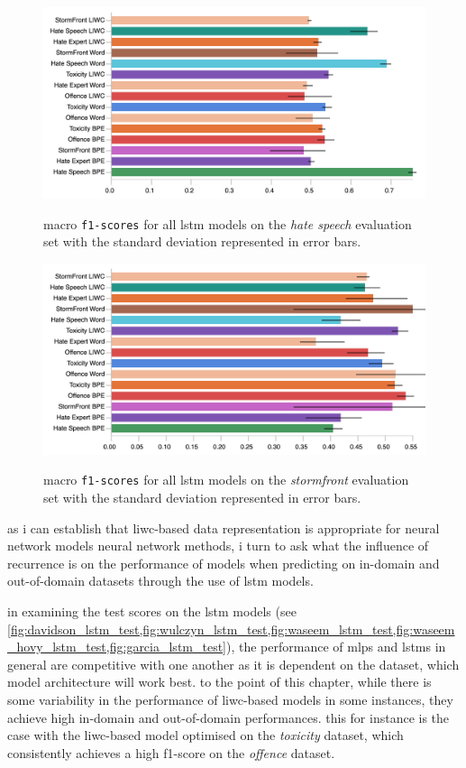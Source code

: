 \begin{figure}
\begin{minipage}{\textwidth}
    \centering
    \includegraphics[width=\textwidth]{all_lstm_waseem_hovy_test.pdf}
    \caption{macro \texttt{f1-scores} for all lstm models on the \textit{hate speech} evaluation set with the standard deviation represented in error bars.}
  \label{fig:waseem_hovy_lstm_test}  
  \vfill
    \includegraphics[width=\textwidth]{all_lstm_garcia_test.pdf}
  \caption{macro \texttt{f1-scores} for all lstm models on the \textit{stormfront} evaluation set with the standard deviation represented in error bars.}
  \label{fig:garcia_lstm_test}
\end{minipage}
\end{figure}

as i can establish that liwc-based data representation is appropriate for neural network models neural network methods, i turn to ask what the influence of recurrence is on the performance of models when predicting on in-domain and out-of-domain datasets through the use of lstm models.

in examining the test scores on the lstm models (see \cref{fig:davidson_lstm_test,fig:wulczyn_lstm_test,fig:waseem_lstm_test,fig:waseem_hovy_lstm_test,fig:garcia_lstm_test}), the performance of mlps and lstms in general are competitive with one another as it is dependent on the dataset, which model architecture will work best.
to the point of this chapter, while there is some variability in the performance of liwc-based models in some instances, they achieve high in-domain and out-of-domain performances.
this for instance is the case with the liwc-based model optimised on the \textit{toxicity} dataset, which consistently achieves a high f1-score on the \textit{offence} dataset.

